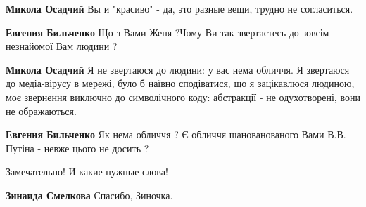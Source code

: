 \begin{itemize}
\begin{itemize}
\textbf{Микола Осадчий} Вы и "красиво" - да, это разные вещи, трудно не согласиться.

 
\textbf{Евгения Бильченко} Що з Вами Женя ?Чому Ви так звертаєтесь до зовсім незнайомої Вам людини ?

 
\textbf{Микола Осадчий} Я не звертаюся до людини: у вас нема обличчя. Я звертаюся до медіа-вірусу в мережі, було б наївно сподіватися, що я зацікавлюся людиною, моє звернення виключно до символічного коду: абстракції - не одухотворені, вони не ображаються.

 
\textbf{Евгения Бильченко} Як нема обличчя ? Є обличчя шанованованого Вами В.В. Путіна - невже цього не досить ?
\end{itemize}

 
Замечательно! И какие нужные слова!

\begin{itemize}
 
\textbf{Зинаида Смелкова} Спасибо, Зиночка.
\end{itemize}

 


\end{itemize}
